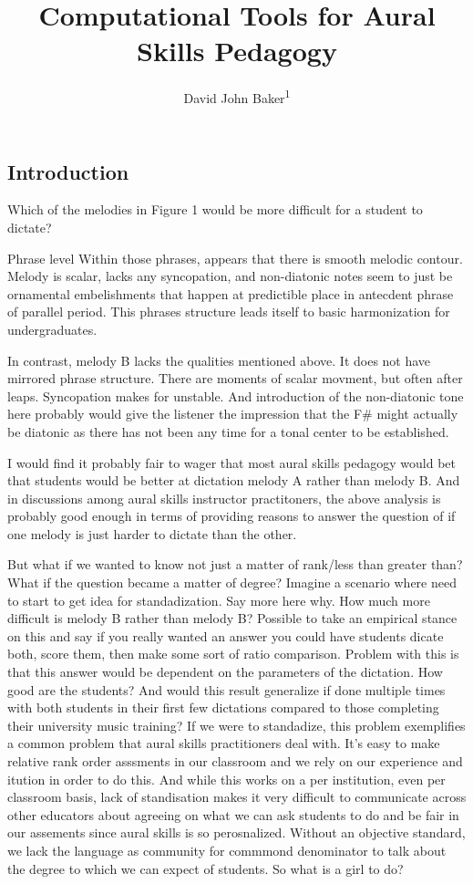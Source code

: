 \documentclass[english,man,floatsintext]{apa6}
\author{David John Baker\textsuperscript{1}}
\affiliation{
\vspace{0.5cm}
\textsuperscript{1} Louisiana State University}
\title{Computational Tools for Aural Skills Pedagogy}
\date{}
\begin{document}
\maketitle

\hypertarget{introduction}{%
\subsection{Introduction}\label{introduction}}

Which of the melodies in Figure 1 would be more difficult for a student to dictate?

Phrase level
Within those phrases, appears that there is smooth melodic contour.
Melody is scalar, lacks any syncopation, and non-diatonic notes seem to just be ornamental embelishments that happen at predictible place in antecdent phrase of parallel period.
This phrases structure leads itself to basic harmonization for undergraduates.

In contrast, melody B lacks the qualities mentioned above.
It does not have mirrored phrase structure.
There are moments of scalar movment, but often after leaps.
Syncopation makes for unstable.
And introduction of the non-diatonic tone here probably would give the listener the impression that the F\# might actually be diatonic as there has not been any time for a tonal center to be established.

I would find it probably fair to wager that most aural skills pedagogy would bet that students would be better at dictation melody A rather than melody B.
And in discussions among aural skills instructor practitoners, the above analysis is probably good enough in terms of providing reasons to answer the question of if one melody is just harder to dictate than the other.

But what if we wanted to know not just a matter of rank/less than greater than?
What if the question became a matter of degree?
Imagine a scenario where need to start to get idea for standadization.
Say more here why.
How much more difficult is melody B rather than melody B?
Possible to take an empirical stance on this and say if you really wanted an answer you could have students dicate both, score them, then make some sort of ratio comparison.
Problem with this is that this answer would be dependent on the parameters of the dictation.
How good are the students?
And would this result generalize if done multiple times with both students in their first few dictations compared to those completing their university music training?
If we were to standadize, this problem exemplifies a common problem that aural skills practitioners deal with.
It's easy to make relative rank order asssments in our classroom and we rely on our experience and itution in order to do this.
And while this works on a per institution, even per classroom basis, lack of standisation makes it very difficult to communicate across other educators about agreeing on what we can ask students to do and be fair in our assements since aural skills is so perosnalized.
Without an objective standard, we lack the language as community for commmond denominator to talk about the degree to which we can expect of students.
So what is a girl to do?
\end{document}
